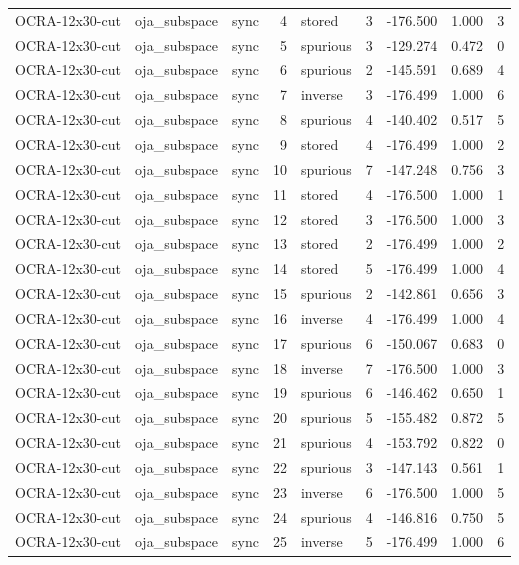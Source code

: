 \begin{tabular}{lllrlrrrr}
OCRA-12x30-cut & oja\_subspace & sync & 4 & stored & 3 & -176.500 & 1.000 & 3 \\
OCRA-12x30-cut & oja\_subspace & sync & 5 & spurious & 3 & -129.274 & 0.472 & 0 \\
OCRA-12x30-cut & oja\_subspace & sync & 6 & spurious & 2 & -145.591 & 0.689 & 4 \\
OCRA-12x30-cut & oja\_subspace & sync & 7 & inverse & 3 & -176.499 & 1.000 & 6 \\
OCRA-12x30-cut & oja\_subspace & sync & 8 & spurious & 4 & -140.402 & 0.517 & 5 \\
OCRA-12x30-cut & oja\_subspace & sync & 9 & stored & 4 & -176.499 & 1.000 & 2 \\
OCRA-12x30-cut & oja\_subspace & sync & 10 & spurious & 7 & -147.248 & 0.756 & 3 \\
OCRA-12x30-cut & oja\_subspace & sync & 11 & stored & 4 & -176.500 & 1.000 & 1 \\
OCRA-12x30-cut & oja\_subspace & sync & 12 & stored & 3 & -176.500 & 1.000 & 3 \\
OCRA-12x30-cut & oja\_subspace & sync & 13 & stored & 2 & -176.499 & 1.000 & 2 \\
OCRA-12x30-cut & oja\_subspace & sync & 14 & stored & 5 & -176.499 & 1.000 & 4 \\
OCRA-12x30-cut & oja\_subspace & sync & 15 & spurious & 2 & -142.861 & 0.656 & 3 \\
OCRA-12x30-cut & oja\_subspace & sync & 16 & inverse & 4 & -176.499 & 1.000 & 4 \\
OCRA-12x30-cut & oja\_subspace & sync & 17 & spurious & 6 & -150.067 & 0.683 & 0 \\
OCRA-12x30-cut & oja\_subspace & sync & 18 & inverse & 7 & -176.500 & 1.000 & 3 \\
OCRA-12x30-cut & oja\_subspace & sync & 19 & spurious & 6 & -146.462 & 0.650 & 1 \\
OCRA-12x30-cut & oja\_subspace & sync & 20 & spurious & 5 & -155.482 & 0.872 & 5 \\
OCRA-12x30-cut & oja\_subspace & sync & 21 & spurious & 4 & -153.792 & 0.822 & 0 \\
OCRA-12x30-cut & oja\_subspace & sync & 22 & spurious & 3 & -147.143 & 0.561 & 1 \\
OCRA-12x30-cut & oja\_subspace & sync & 23 & inverse & 6 & -176.500 & 1.000 & 5 \\
OCRA-12x30-cut & oja\_subspace & sync & 24 & spurious & 4 & -146.816 & 0.750 & 5 \\
OCRA-12x30-cut & oja\_subspace & sync & 25 & inverse & 5 & -176.499 & 1.000 & 6 \\

\end{tabular}
